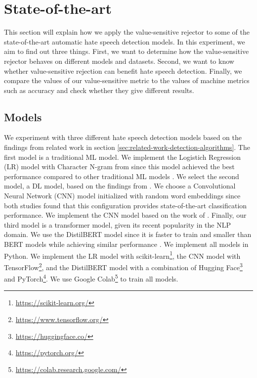 \section{State-of-the-art}
\label{sec:state-of-the-art}
This section will explain how we apply the value-sensitive rejector to some of the state-of-the-art automatic hate speech detection models.
%
In this experiment, we aim to find out three things.
%
First, we want to determine how the value-sensitive rejector behaves on different models and datasets.
%
Second, we want to know whether value-sensitive rejection can benefit hate speech detection.
%
Finally, we compare the values of our value-sensitive metric to the values of machine metrics such as accuracy and check whether they give different results.
%

\subsection{Models}
We experiment with three different hate speech detection models based on the findings from related work in section \ref{sec:related-work-detection-algorithms}.
%
The first model is a traditional ML model.
%
We implement the Logistich Regression (LR) model with Character N-gram from \citet{waseem2016hateful} since this model achieved the best performance compared to other traditional ML models \citep{davidson2017automated}.
%
We select the second model, a DL model, based on the findings from \citet{agrawal2018deep, badjatiya2017deep}.
%
We choose a Convolutional Neural Network (CNN) model initialized with random word embeddings since both studies found that this configuration provides state-of-the-art classification performance.
%
We implement the CNN model based on the work of \citep{agrawal2018deep}.
%
Finally, our third model is a transformer model, given its recent popularity in the NLP domain.
%
We use the DistilBERT model since it is faster to train and smaller than BERT models while achieving similar performance \citep{sanh2019distilbert}.
We implement all models in Python.
%
We implement the LR model with scikit-learn\footnote{\url{https://scikit-learn.org/}}, the CNN model with TensorFlow\footnote{\url{https://www.tensorflow.org/}}, and the DistilBERT model with a combination of Hugging Face\footnote{\url{https://huggingface.co/}} and PyTorch\footnote{\url{https://pytorch.org/}}.
%
We use Google Colab\footnote{\url{https://colab.research.google.com/}} to train all models.
%


